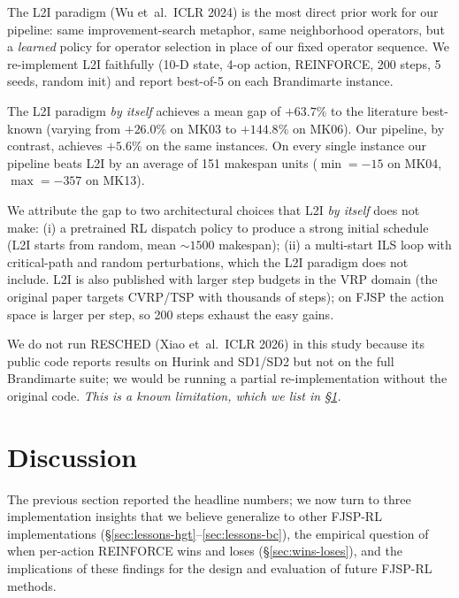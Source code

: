 \documentclass[10pt]{article}
\theoremstyle{definition}
\newcommand{\etal}{et~al.\!}
\begin{document}
The L2I paradigm (Wu \etal\ ICLR 2024) is the most direct
prior work for our pipeline: same improvement-search
metaphor, same neighborhood operators, but a \emph{learned}
policy for operator selection in place of our fixed
operator sequence. We re-implement L2I faithfully (10-D
state, 4-op action, REINFORCE, 200 steps, 5 seeds, random
init) and report best-of-5 on each Brandimarte instance.

The L2I paradigm \emph{by itself} achieves a mean gap of
$+63.7\%$ to the literature best-known (varying from
$+26.0\%$ on MK03 to $+144.8\%$ on MK06). Our pipeline,
by contrast, achieves $+5.6\%$ on the same instances.
On every single instance our pipeline beats L2I by an
average of 151 makespan units ($\min = -15$ on MK04,
$\max = -357$ on MK13).

We attribute the gap to two architectural choices that
L2I \emph{by itself} does not make: (i) a pretrained
RL dispatch policy to produce a strong initial schedule
(L2I starts from random, mean $\sim 1500$ makespan); (ii)
a multi-start ILS loop with critical-path and random
perturbations, which the L2I paradigm does not include.
L2I is also published with larger step budgets in the
VRP domain (the original paper targets CVRP/TSP with
thousands of steps); on FJSP the action space is larger
per step, so 200 steps exhaust the easy gains.

We do not run RESCHED (Xiao \etal\ ICLR 2026) in this
study because its public code reports results on
Hurink and SD1/SD2 but not on the full Brandimarte
suite; we would be running a partial re-implementation
without the original code. \emph{This is a known
limitation, which we list in \S\ref{sec:discussion}.}

\section{Discussion}
\label{sec:discussion}

The previous section reported the headline numbers; we
now turn to three implementation insights that we believe
generalize to other FJSP-RL implementations
(\S\ref{sec:lessons-hgt}--\ref{sec:lessons-bc}), the
empirical question of when per-action REINFORCE wins
and loses (\S\ref{sec:wins-loses}), and the implications
of these findings for the design and evaluation of
future FJSP-RL methods.
\end{document}
